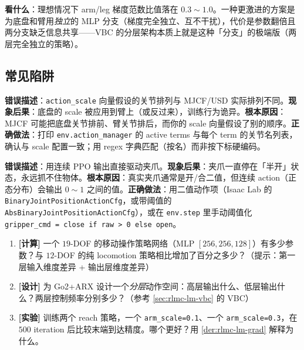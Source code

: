 \textbf{看什么}：理想情况下 arm/leg 梯度范数比值落在 $0.3\!\sim\!1.0$。一种更激进的方案是为底盘和臂用\emph{独立}的 MLP 分支（梯度完全独立、互不干扰），代价是参数翻倍且两分支缺乏信息共享——VBC 的分层架构本质上就是这种「分支」的极端版（两层完全独立的策略）。

\subsection{常见陷阱}
\label{sec:rlmc-lm-action-pitfalls}

\begin{pitfall}[混合动作空间的关节顺序不一致]
\textbf{错误描述}：\verb|action_scale| 向量假设的关节排列与 MJCF/USD 实际排列不同。\textbf{现象后果}：底盘的 scale 被应用到臂上（或反过来），训练行为诡异。\textbf{根本原因}：MJCF 可能把底盘关节排前、臂关节排后，而你的 scale 向量假设了别的顺序。\textbf{正确做法}：打印 \verb|env.action_manager| 的 active terms 与每个 term 的关节名列表，确认与 scale 配置一致；用 regex 字典匹配（按名）而非按下标硬编码。
\end{pitfall}

\begin{pitfall}
\textbf{错误描述}：用连续 PPO 输出直接驱动夹爪。\textbf{现象后果}：夹爪一直停在「半开」状态，永远抓不住物体。\textbf{根本原因}：真实夹爪通常是开/合二值，但连续 action（正态分布）会输出 $0\!\sim\!1$ 之间的值。\textbf{正确做法}：用二值动作项（Isaac Lab 的 \verb|BinaryJointPositionActionCfg|，或带阈值的 \verb|AbsBinaryJointPositionActionCfg|），或在 \verb|env.step| 里手动阈值化 \verb|gripper_cmd = close if raw > 0 else open|。
\end{pitfall}

\begin{practice}[练习·混合动作空间]
\begin{enumerate}
\item \textbf{[计算]} 一个 $19$-DOF 的移动操作策略网络（MLP $[256,256,128]$）有多少参数？与 $12$-DOF 的纯 locomotion 策略相比增加了百分之多少？（提示：第一层输入维度差异 + 输出层维度差异）
\item \textbf{[设计]} 为 Go2+ARX 设计一个\emph{分层}动作空间：高层输出什么、低层输出什么？两层控制频率分别多少？（参考 \cref{sec:rlmc-lm-vbc} 的 VBC）
\item \textbf{[实验]} 训练两个 reach 策略，一个 \verb|arm_scale=0.1|、一个 \verb|arm_scale=0.3|，在 $500$ iteration 后比较末端到达精度。哪个更好？用 \cref{der:rlmc-lm-grad} 解释为什么。
\end{enumerate}
\end{practice}

